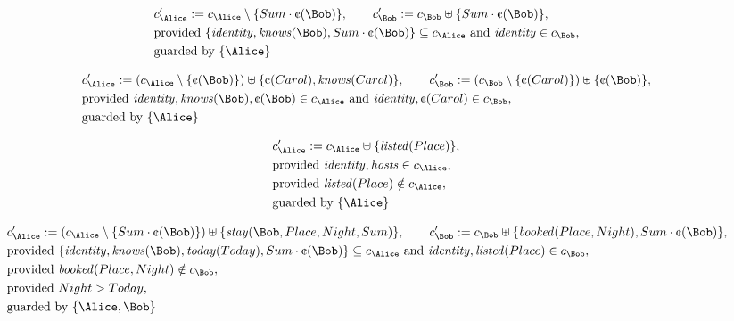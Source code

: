 \begin{align*}
&
c'_
{
\Alice
}
 := 
c_
{
\Alice
}
 \setminus 
\{
Sum
\cdot
\text{\textcent}
(
\Bob
)
\}
, \qquad 
c'_
{
\Bob
}
 := 
c_
{
\Bob
}
 \uplus 
\{
Sum
\cdot
\text{\textcent}
(
\Bob
)
\}
,\\
&
\text{provided } 
\{
\mathit{
identity
}
,
\mathit{
knows
}
(
\Bob
)
,
Sum
\cdot
\text{\textcent}
(
\Bob
)
\}
 \subseteq c_
{
\Alice
}
 \text{ and } 
\mathit{
identity
}
 \in c_
{
\Bob
}
,\\
&
\text{guarded by } \{
\Alice
\}
\end{align*}

\begin{align*}
&
c'_
{
\Alice
}
 := 
(c_
{
\Alice
}
 \setminus 
\{
\text{\textcent}
(
\Bob
)
\}
) \uplus 
\{
\text{\textcent}
(
Carol
)
,
\mathit{
knows
}
(
Carol
)
\}
, \qquad 
c'_
{
\Bob
}
 := 
(c_
{
\Bob
}
 \setminus 
\{
\text{\textcent}
(
Carol
)
\}
) \uplus 
\{
\text{\textcent}
(
\Bob
)
\}
,\\
&
\text{provided } 
\mathit{
identity
}
,
\mathit{
knows
}
(
\Bob
)
,
\text{\textcent}
(
\Bob
)
 \in c_
{
\Alice
}
 \text{ and } 
\mathit{
identity
}
,
\text{\textcent}
(
Carol
)
 \in c_
{
\Bob
}
,\\
&
\text{guarded by } \{
\Alice
\}
\end{align*}

\begin{align*}
&
c'_
{
\Alice
}
 := 
c_
{
\Alice
}
 \uplus 
\{
\mathit{
listed
}
(
Place
)
\}
,\\
&
\text{provided } 
\mathit{
identity
}
,
\mathit{
hosts
}
 \in c_
{
\Alice
}
,\\
&
\text{provided } 
\mathit{
listed
}
(
Place
)
 \notin c_
{
\Alice
}
,\\
&
\text{guarded by } \{
\Alice
\}
\end{align*}

\begin{align*}
&
c'_
{
\Alice
}
 := 
(c_
{
\Alice
}
 \setminus 
\{
Sum
\cdot
\text{\textcent}
(
\Bob
)
\}
) \uplus 
\{
\mathit{
stay
}
(
\Bob
,
Place
,
Night
,
Sum
)
\}
, \qquad 
c'_
{
\Bob
}
 := 
c_
{
\Bob
}
 \uplus 
\{
\mathit{
booked
}
(
Place
,
Night
)
,
Sum
\cdot
\text{\textcent}
(
\Bob
)
\}
,\\
&
\text{provided } 
\{
\mathit{
identity
}
,
\mathit{
knows
}
(
\Bob
)
,
\mathit{
today
}
(
Today
)
,
Sum
\cdot
\text{\textcent}
(
\Bob
)
\}
 \subseteq c_
{
\Alice
}
 \text{ and } 
\mathit{
identity
}
,
\mathit{
listed
}
(
Place
)
 \in c_
{
\Bob
}
,\\
&
\text{provided } 
\mathit{
booked
}
(
Place
,
Night
)
 \notin c_
{
\Bob
}
,\\
&
\text{provided } 
Night
>
Today
,\\
&
\text{guarded by } \{
\Alice
,
\Bob
\}
\end{align*}
